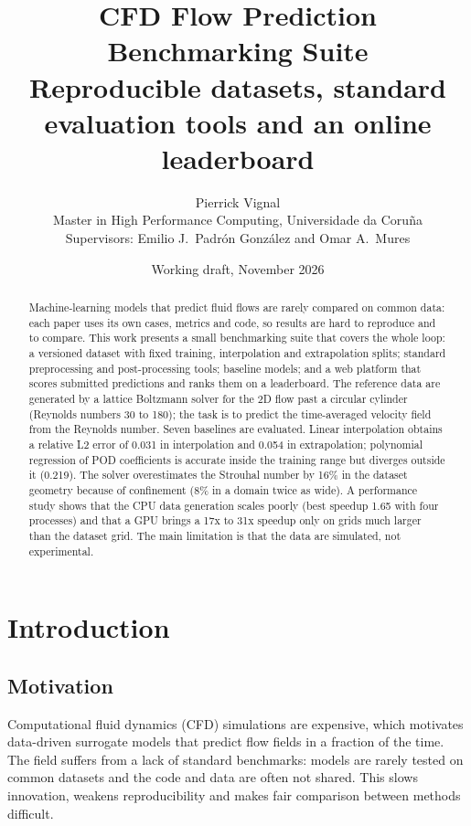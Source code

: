 \documentclass[11pt,a4paper]{article}
\title{\textbf{CFD Flow Prediction Benchmarking Suite}\\[4pt]
\large Reproducible datasets, standard evaluation tools and an online leaderboard}
\author{Pierrick Vignal\\[6pt]
\small Master in High Performance Computing, Universidade da Coru\~na\\
\small Supervisors: Emilio J.\ Padr\'on Gonz\'alez and Omar A.\ Mures}
\date{Working draft, November 2026}
\begin{document}
\maketitle

\begin{abstract}
Machine-learning models that predict fluid flows are rarely compared on common data: each paper uses its own cases, metrics and code, so results are hard to reproduce and to compare. This work presents a small benchmarking suite that covers the whole loop: a versioned dataset with fixed training, interpolation and extrapolation splits; standard preprocessing and post-processing tools; baseline models; and a web platform that scores submitted predictions and ranks them on a leaderboard. The reference data are generated by a lattice Boltzmann solver for the 2D flow past a circular cylinder (Reynolds numbers 30 to 180); the task is to predict the time-averaged velocity field from the Reynolds number. Seven baselines are evaluated. Linear interpolation obtains a relative L2 error of 0.031 in interpolation and 0.054 in extrapolation; polynomial regression of POD coefficients is accurate inside the training range but diverges outside it (0.219). The solver overestimates the Strouhal number by 16\% in the dataset geometry because of confinement (8\% in a domain twice as wide). A performance study shows that the CPU data generation scales poorly (best speedup 1.65 with four processes) and that a GPU brings a 17x to 31x speedup only on grids much larger than the dataset grid. The main limitation is that the data are simulated, not experimental.
\end{abstract}

\newpage
\tableofcontents
\newpage

\section{Introduction}
\subsection{Motivation}
Computational fluid dynamics (CFD) simulations are expensive, which motivates data-driven surrogate models that predict flow fields in a fraction of the time. The field suffers from a lack of standard benchmarks: models are rarely tested on common datasets and the code and data are often not shared. This slows innovation, weakens reproducibility and makes fair comparison between methods difficult.
\end{document}

